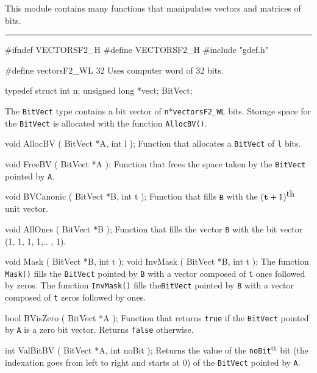 This module contains many functions that manipulates vectors and
 matrices of bits.

\bigskip\hrule

\code\hide
#ifndef VECTORSF2_H
#define VECTORSF2_H
\endhide
#include "gdef.h"
\endcode
\code

#define vectorsF2_WL      32
\endcode
 \tab
Uses computer word of 32 bits.
 \endtab
\bigskip




\code

typedef struct{
   int n;
   unsigned long *vect;
} BitVect;
\endcode

 \tab
The {\tt BitVect} type contains a bit vector of
 {\tt n}*{\tt vectorsF2\_WL} bits.  Storage space for
the {\tt BitVect} is allocated with the function {\tt AllocBV()}.
 \endtab
\code


void AllocBV ( BitVect *A,
               int l
             );
\endcode
 \tab
Function that allocates a {\tt BitVect} of {\tt l} bits.
 \endtab
\code


void FreeBV ( BitVect *A
            );
\endcode
 \tab
Function that frees the space taken by the {\tt BitVect} pointed by {\tt A}.
 \endtab
\code


void BVCanonic ( BitVect *B,
                 int t
               );
\endcode
 \tab
Function that fills {\tt B} with the $({\tt t}+1)^{\mbox{th}}$ unit vector.
 \endtab
\code


void AllOnes ( BitVect *B
             );
\endcode
 \tab
Function that fills the vector {\tt B} with the bit vector (1, 1, 1, 1,.. , 1).
 \endtab
\code


void Mask ( BitVect *B,
            int t
          );
void InvMask ( BitVect *B,
               int t
             );
\endcode
 \tab
The function {\tt Mask()} fills the {\tt BitVect} pointed by {\tt B} with a vector composed of {\tt t} ones followed by zeros.
The function {\tt InvMask()} fills the{\tt BitVect} pointed by {\tt B} with a vector composed of {\tt t} zeros followed by ones.
 \endtab
\code


bool BVisZero ( BitVect *A
                );
\endcode
 \tab
Function that returns {\tt true} if the {\tt BitVect} pointed by {\tt A} is a zero bit vector.  Returns {\tt false} otherwise.
\endtab
\code


int ValBitBV ( BitVect *A,
               int noBit
             );
\endcode
 \tab
Returns the value of the {\tt noBit}$^{\mbox{th}}$ bit (the indexation goes from left to right and starts at 0) of the
{\tt BitVect} pointed by {\tt A}.
 \endtab
\code


